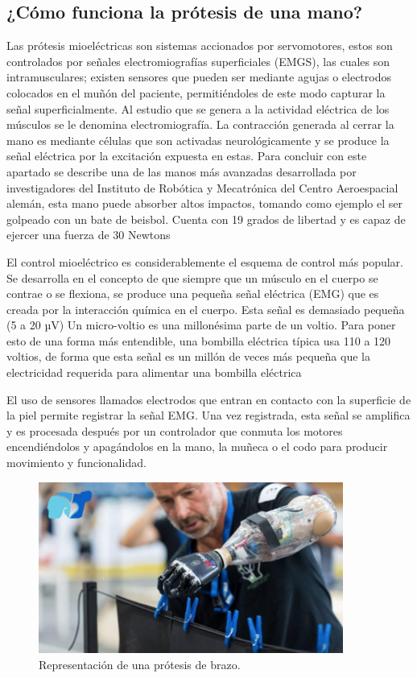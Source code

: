 \documentclass{article}
\begin{document}
\subsection{¿Cómo funciona la prótesis de una mano?}
Las prótesis mioeléctricas son sistemas accionados por servomotores, estos son controlados por señales electromiografías superficiales (EMGS), las cuales son intramusculares; existen sensores que pueden ser mediante agujas o electrodos colocados en el muñón del paciente, permitiéndoles de este modo capturar la señal superficialmente. Al estudio que se genera a la actividad eléctrica de los músculos se le denomina electromiografía. La contracción generada al cerrar la mano es mediante células que son activadas neurológicamente y se produce la señal eléctrica por la excitación expuesta en estas. Para concluir con este apartado se describe una de las manos más avanzadas desarrollada por investigadores del Instituto de Robótica y Mecatrónica del Centro Aeroespacial alemán, esta mano puede absorber altos impactos, tomando como ejemplo el ser golpeado con un bate de beisbol. Cuenta con 19 grados de libertad y es capaz de ejercer una fuerza de 30 Newtons\cite{ff4}   

El control mioeléctrico es considerablemente el esquema de control más popular. Se desarrolla en el concepto de que siempre que un músculo en el cuerpo se contrae o se flexiona, se produce una pequeña señal eléctrica (EMG) que es creada por la interacción química en el cuerpo. Esta señal es demasiado pequeña (5 a 20 µV) Un micro-voltio es una millonésima parte de un voltio. Para poner esto de una forma más entendible, una bombilla eléctrica típica usa 110 a 120 voltios, de forma que esta señal es un millón de veces más pequeña que la electricidad requerida para alimentar una bombilla eléctrica\cite{ff4}   

El uso de sensores llamados electrodos que entran en contacto con la superficie de la piel permite registrar la señal EMG. Una vez registrada, esta señal se amplifica y es procesada después por un controlador que conmuta los motores encendiéndolos y apagándolos en la mano, la muñeca o el codo para producir movimiento y funcionalidad\cite{ff4}. 

\begin{figure}[H] %
    \centering
    \includegraphics[width=100mm]{representacion.png} %
    \caption{Representación de una prótesis de brazo\cite{ff4}.}
    \label{grafica:tres}
\end{figure}
\end{document}
